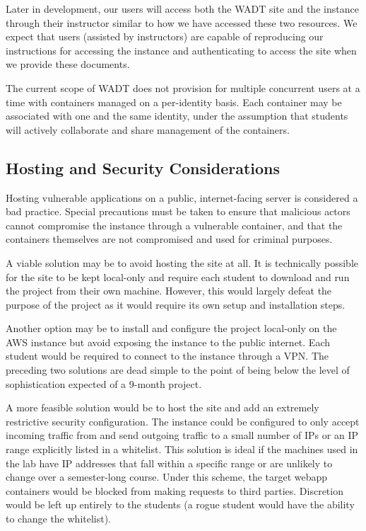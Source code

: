 \documentclass[12pt]{article}
\begin{document}
Later in development, our users will access both the WADT site and the instance through their instructor similar to how we have accessed these two resources. We expect that users (assisted by instructors) are capable of reproducing our instructions for accessing the instance and authenticating to access the site when we provide these documents.

The current scope of WADT does not provision for multiple concurrent users at a time with containers managed on a per-identity basis. Each container may be associated with one and the same identity, under the assumption that students will actively collaborate and share management of the containers.

\subsection{Hosting and Security Considerations}
Hosting vulnerable applications on a public, internet-facing server is considered a bad practice. Special precautions must be taken to ensure that malicious actors cannot compromise the instance through a vulnerable container, and that the containers themselves are not compromised and used for criminal purposes.

A viable solution may be to avoid hosting the site at all. It is technically possible for the site to be kept local-only and require each student to download and run the project from their own machine. However, this would largely defeat the purpose of the project as it would require its own setup and installation steps.

Another option may be to install and configure the project local-only on the AWS instance but avoid exposing the instance to the public internet. Each student would be required to connect to the instance through a VPN. The preceding two solutions are dead simple to the point of being below the level of sophistication expected of a 9-month project.

A more feasible solution would be to host the site and add an extremely restrictive security configuration. The instance could be configured to only accept incoming traffic from and send outgoing traffic to a small number of IPs or an IP range explicitly listed in a whitelist. This solution is ideal if the machines used in the lab have IP addresses that fall within a specific range or are unlikely to change over a semester-long course. Under this scheme, the target webapp containers would be blocked from making requests to third parties. Discretion would be left up entirely to the students (a rogue student would have the ability to change the whitelist).
\end{document}
